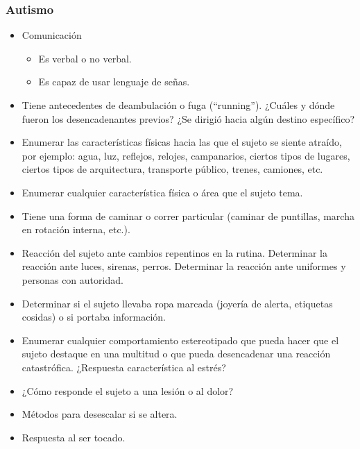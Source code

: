 \subsubsection{Autismo}
\begin{itemize}
    \item Comunicación 
    \begin{itemize}
        \item Es verbal o no verbal.
        \item Es capaz de usar lenguaje de señas.
    \end{itemize}
    \item Tiene antecedentes de deambulación o fuga (“running”). ¿Cuáles y dónde fueron los desencadenantes previos? ¿Se dirigió hacia algún destino específico?
    \item Enumerar las características físicas hacia las que el sujeto se siente atraído, por ejemplo: agua, luz, reflejos, relojes, campanarios, ciertos tipos de lugares, ciertos tipos de arquitectura, transporte público, trenes, camiones, etc.
    \item Enumerar cualquier característica física o área que el sujeto tema.
    \item Tiene una forma de caminar o correr particular (caminar de puntillas, marcha en rotación interna, etc.).
    \item Reacción del sujeto ante cambios repentinos en la rutina. Determinar la reacción ante luces, sirenas, perros. Determinar la reacción ante uniformes y personas con autoridad.
    \item Determinar si el sujeto llevaba ropa marcada (joyería de alerta, etiquetas cosidas) o si portaba información.
    \item Enumerar cualquier comportamiento estereotipado que pueda hacer que el sujeto destaque en una multitud o que pueda desencadenar una reacción catastrófica. ¿Respuesta característica al estrés?
    \item ¿Cómo responde el sujeto a una lesión o al dolor?
    \item Métodos para desescalar si se altera.
    \item Respuesta al ser tocado.
\end{itemize}

